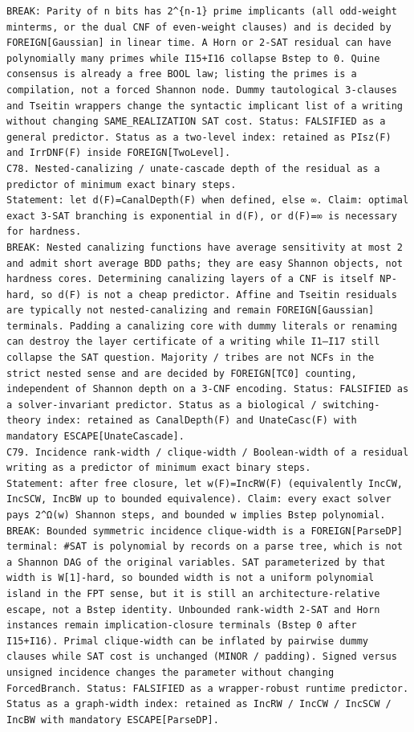 \documentclass[11pt]{article}
\begin{document}
\begin{Verbatim}[breaklines=true,breakanywhere=true]
BREAK: Parity of n bits has 2^{n-1} prime implicants (all odd-weight minterms, or the dual CNF of even-weight clauses) and is decided by FOREIGN[Gaussian] in linear time. A Horn or 2-SAT residual can have polynomially many primes while I15+I16 collapse Bstep to 0. Quine consensus is already a free BOOL law; listing the primes is a compilation, not a forced Shannon node. Dummy tautological 3-clauses and Tseitin wrappers change the syntactic implicant list of a writing without changing SAME_REALIZATION SAT cost. Status: FALSIFIED as a general predictor. Status as a two-level index: retained as PIsz(F) and IrrDNF(F) inside FOREIGN[TwoLevel].
C78. Nested-canalizing / unate-cascade depth of the residual as a predictor of minimum exact binary steps.
Statement: let d(F)=CanalDepth(F) when defined, else ∞. Claim: optimal exact 3-SAT branching is exponential in d(F), or d(F)=∞ is necessary for hardness.
BREAK: Nested canalizing functions have average sensitivity at most 2 and admit short average BDD paths; they are easy Shannon objects, not hardness cores. Determining canalizing layers of a CNF is itself NP-hard, so d(F) is not a cheap predictor. Affine and Tseitin residuals are typically not nested-canalizing and remain FOREIGN[Gaussian] terminals. Padding a canalizing core with dummy literals or renaming can destroy the layer certificate of a writing while I1–I17 still collapse the SAT question. Majority / tribes are not NCFs in the strict nested sense and are decided by FOREIGN[TC0] counting, independent of Shannon depth on a 3-CNF encoding. Status: FALSIFIED as a solver-invariant predictor. Status as a biological / switching-theory index: retained as CanalDepth(F) and UnateCasc(F) with mandatory ESCAPE[UnateCascade].
C79. Incidence rank-width / clique-width / Boolean-width of a residual writing as a predictor of minimum exact binary steps.
Statement: after free closure, let w(F)=IncRW(F) (equivalently IncCW, IncSCW, IncBW up to bounded equivalence). Claim: every exact solver pays 2^Ω(w) Shannon steps, and bounded w implies Bstep polynomial.
BREAK: Bounded symmetric incidence clique-width is a FOREIGN[ParseDP] terminal: #SAT is polynomial by records on a parse tree, which is not a Shannon DAG of the original variables. SAT parameterized by that width is W[1]-hard, so bounded width is not a uniform polynomial island in the FPT sense, but it is still an architecture-relative escape, not a Bstep identity. Unbounded rank-width 2-SAT and Horn instances remain implication-closure terminals (Bstep 0 after I15+I16). Primal clique-width can be inflated by pairwise dummy clauses while SAT cost is unchanged (MINOR / padding). Signed versus unsigned incidence changes the parameter without changing ForcedBranch. Status: FALSIFIED as a wrapper-robust runtime predictor. Status as a graph-width index: retained as IncRW / IncCW / IncSCW / IncBW with mandatory ESCAPE[ParseDP].

\end{Verbatim}
\end{document}
